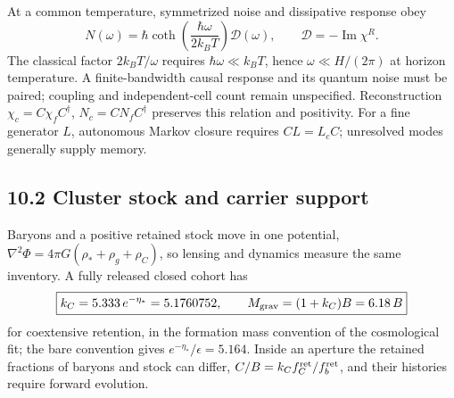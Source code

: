 \documentclass[11pt]{article}
\begin{document}
At a common temperature, symmetrized noise and dissipative response obey
\[
N(\omega)=\hbar\coth\!\left(\frac{\hbar\omega}{2k_BT}\right)\mathcal D(\omega),
\qquad \mathcal D=-\operatorname{Im}\chi^R.
\]
The classical factor $2k_BT/\omega$ requires $\hbar\omega\ll k_BT$, hence $\omega\ll H/(2\pi)$ at horizon temperature. A finite-bandwidth causal response and its quantum noise must be paired; coupling and independent-cell count remain unspecified. Reconstruction $\chi_c=C\chi_fC^\dagger$, $N_c=CN_fC^\dagger$ preserves this relation and positivity. For a fine generator $L$, autonomous Markov closure requires $CL=L_cC$; unresolved modes generally supply memory.

\subsection{10.2 Cluster stock and carrier support}

Baryons and a positive retained stock move in one potential, $\nabla^2\Phi=4\pi G(\rho_*+\rho_g+\rho_C)$, so lensing and dynamics measure the same inventory. A fully released closed cohort has
\[
\boxed{k_C=5.333\,e^{-\eta_*}=5.1760752,\qquad M_{\rm grav}=(1+k_C)B=6.18\,B}
\]
for coextensive retention, in the formation mass convention of the cosmological fit; the bare convention gives $e^{-\eta_*}/\epsilon=5.164$. Inside an aperture the retained fractions of baryons and stock can differ, $C/B=k_Cf_C^{\rm ret}/f_b^{\rm ret}$, and their histories require forward evolution.
\end{document}
